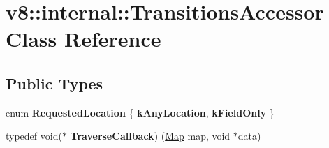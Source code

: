 \hypertarget{classv8_1_1internal_1_1TransitionsAccessor}{}\section{v8\+:\+:internal\+:\+:Transitions\+Accessor Class Reference}
\label{classv8_1_1internal_1_1TransitionsAccessor}
\subsection*{Public Types}
\begin{DoxyCompactItemize}
\item 
\mbox{\label{classv8_1_1internal_1_1TransitionsAccessor_a6d93984a167cb84a4fe9d1231818464b}} 
enum {\bfseries Requested\+Location} \{ {\bfseries k\+Any\+Location}, 
{\bfseries k\+Field\+Only}
 \}
\item 
\mbox{\label{classv8_1_1internal_1_1TransitionsAccessor_a280593c33519a44c39eb3b6adc317982}} 
typedef void($\ast$ {\bfseries Traverse\+Callback}) (\mbox{\hyperlink{classv8_1_1internal_1_1Map}{Map}} map, void $\ast$data)
\end{DoxyCompactItemize}
